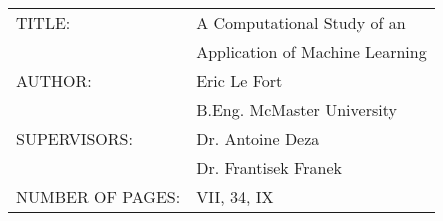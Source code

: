 \thispagestyle{plain}
\\
\vspace{4cm}
\begin{flushleft}
\begin{tabular}{l l}
	TITLE: 				&\hspace{3cm}A Computational Study of an\\
	~					&\hspace{3cm}Application of Machine Learning\\
	AUTHOR: 			&\hspace{3cm}Eric Le Fort\\
	~					&\hspace{3cm}B.Eng. McMaster University\\
	SUPERVISORS: 		&\hspace{3cm}Dr. Antoine Deza\\
	~					&\hspace{3cm}Dr. Frantisek Franek \\
	NUMBER OF PAGES:	&\hspace{3cm}VII, 34, IX
\end{tabular} 
\end{flushleft}